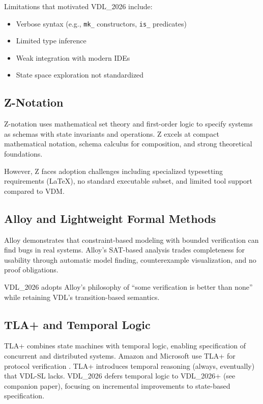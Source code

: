 \documentclass[conference]{IEEEtran}
\begin{document}
Limitations that motivated VDL\_2026 include:
\begin{itemize}
\item Verbose syntax (e.g., \texttt{mk\_} constructors, \texttt{is\_} predicates)
\item Limited type inference
\item Weak integration with modern IDEs
\item State space exploration not standardized
\end{itemize}

\subsection{Z-Notation}

Z-notation \cite{spivey1989} uses mathematical set theory and first-order logic to specify systems as schemas with state invariants and operations. Z excels at compact mathematical notation, schema calculus for composition, and strong theoretical foundations.

However, Z faces adoption challenges including specialized typesetting requirements (LaTeX), no standard executable subset, and limited tool support compared to VDM.

\subsection{Alloy and Lightweight Formal Methods}

Alloy \cite{jackson2012} demonstrates that constraint-based modeling with bounded verification can find bugs in real systems. Alloy's SAT-based analysis trades completeness for usability through automatic model finding, counterexample visualization, and no proof obligations.

VDL\_2026 adopts Alloy's philosophy of ``some verification is better than none'' while retaining VDL's transition-based semantics.

\subsection{TLA+ and Temporal Logic}

TLA+ \cite{lamport2002} combines state machines with temporal logic, enabling specification of concurrent and distributed systems. Amazon and Microsoft use TLA+ for protocol verification \cite{newcombe2015}. TLA+ introduces temporal reasoning (always, eventually) that VDL-SL lacks. VDL\_2026 defers temporal logic to VDL\_2026+ (see companion paper), focusing on incremental improvements to state-based specification.
\end{document}
